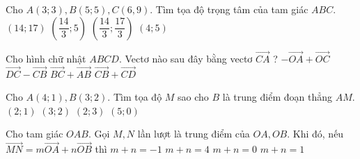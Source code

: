 \begin{ex}%
	Cho $A(3;3),B(5;5),C(6,9).$ Tìm tọa độ trọng tâm của tam giác $ABC$.
	\choice
	{$\left(14;17\right)$}
	{$ \left(\dfrac{14}{3};5\right)$}
	{\True $\left(\dfrac{14}{3};\dfrac{17}{3}\right)$}
	{$ \left(4;5\right)$}
\end{ex}

\begin{ex}%
	Cho hình chữ nhật $ABCD$. Vectơ nào sau đây bằng vectơ $\vec{CA}$ ?
	\choice
	{$-\vec{OA}+\vec{OC}$}
	{$ \vec{DC}-\vec{CB}$}
	{$ \vec{BC}+\vec{AB}$}
	{\True $ \vec{CB}+\vec{CD}$}
\end{ex}

\begin{ex}%
	Cho $A(4;1),B(3;2).$ Tìm tọa độ $M$ sao cho $B$ là trung điểm đoạn thẳng $AM$.
	\choice
	{ $\left(2;1\right)$}
	{$ \left(3;2\right)$}
	{\True $\left(2;3\right)$}
	{$ \left(5;0\right)$}
\end{ex}

\begin{ex}%
	Cho tam giác $OAB$. Gọi $M,N$ lần lượt là trung điểm của $OA,OB$. Khi đó, nếu $\vec{MN}=m\vec{OA}+n\vec{OB}$ thì
	\choice
	{ $m+n=-1$}
	{$ m+n=4$}
	{\True $ m+n=0$}
	{$ m+n=1$}
\end{ex}

